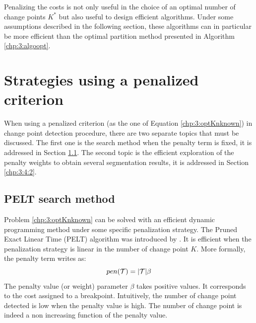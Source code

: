Penalizing the costs is not only useful in the choice of an optimal number of change points $K^*$ but also useful to design efficient algorithms. Under some assumptions described in the following section, these algorithms can in particular be more efficient than the optimal partition method presented in Algorithm \ref{chp:3:algoopt}. 

\section{Strategies using a penalized criterion}\label{chp:3:4}

When using a penalized criterion (as the one of Equation \eqref{chp:3:optKnknown}) in change point detection procedure, there are two separate topics that must be discussed. The first one is the search method when the penalty term is fixed, it is addressed in Section \ref{chp:3:4:1}. The second topic is the efficient exploration of the penalty weights to obtain several segmentation results, it is addressed in Section \ref{chp:3:4:2}.   

\subsection{PELT search method}\label{chp:3:4:1}

Problem \eqref{chp:3:optKnknown} can be solved with an efficient dynamic programming method under some specific penalization strategy. The Pruned Exact Linear Time (PELT) algorithm was introduced by \cite{Killick2012}. It is efficient when the penalization strategy is linear in the number of change point $K$. More formally, the penalty term writes as:
$$pen({\mathcal T}) = \lvert{\mathcal T}\rvert\beta$$ 
The penalty value (or weight) parameter $\beta$ takes positive values. It corresponds to the cost assigned to a breakpoint. Intuitively, the number of change point detected is low when the penalty value is high. The number of change point is indeed a non increasing function of the penalty value. 


